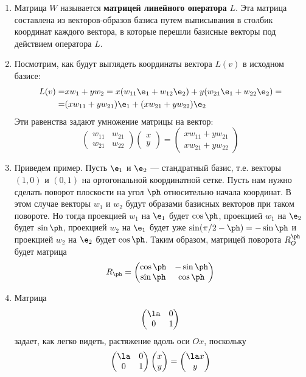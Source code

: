 \begin{enumerate}
\item Матрица $W$ называется \textbf{матрицей линейного оператора} $L$. Эта матрица составлена из векторов-образов базиса путем выписывания в столбик координат каждого вектора, в которые перешли базисные векторы под действием оператора $L$.
\item Посмотрим, как будут выглядеть координаты вектора $L(v)$ в исходном базисе:
\begin{align*}
L(v)= & xw_1+yw_2 = x(w_{11}\e_1+w_{12}\e_2)+y(w_{21}\e_1+w_{22}\e_2)= \\
= & (xw_{11}+yw_{21})\e_1+(xw_{21}+yw_{22})\e_2
\end{align*}
Эти равенства задают умножение матрицы на вектор:
$$
\begin{pmatrix}
w_{11} & w_{21} \\ w_{21} & w_{22}
\end{pmatrix}
\begin{pmatrix}
x  \\ y
\end{pmatrix} =
\begin{pmatrix}
xw_{11}+yw_{21}  \\ xw_{21}+yw_{22}
\end{pmatrix}
$$

\item Приведем пример. Пусть $\e_1$ и $\e_2$ --- стандратный базис, т.е. векторы $(1,0)$ и $(0,1)$ на ортогональной координатной сетке. Пусть нам нужно сделать поворот плоскости на угол $\ph$ относительно начала координат. В этом случае векторы $w_1$ и $w_2$ будут образами базисных векторов при таком повороте. Но тогда проекцией $w_1$ на $\e_1$ будет $\cos\ph$, проекцией $w_1$ на $\e_2$ будет $\sin\ph$, проекцией $w_2$ на $\e_1$ будет уже $\sin(\pi/2-\ph)=-\sin\ph$ и проекцией $w_2$ на $\e_2$ будет $\cos\ph$. Таким образом, матрицей поворота $R_O^\ph$ будет матрица
$$
R_\ph = \begin{pmatrix}
\cos\ph & -\sin\ph \\ \sin\ph & \cos\ph
\end{pmatrix}
$$
\item Матрица
$$
\begin{pmatrix}
\la & 0 \\ 0 & 1
\end{pmatrix}
$$
задает, как легко видеть, растяжение вдоль оси $Ox$, поскольку
$$
\begin{pmatrix}
\la & 0 \\ 0 & 1
\end{pmatrix}
\begin{pmatrix}
x  \\ y
\end{pmatrix} =
\begin{pmatrix}
\la x  \\ y
\end{pmatrix}
$$


\end{enumerate}
